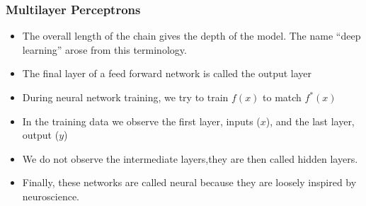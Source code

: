 \documentclass[
  shownotes,
  xcolor={svgnames},
  hyperref={colorlinks,citecolor=DarkBlue,linkcolor=DarkRed,urlcolor=DarkBlue}
  , aspectratio=169]{beamer}
\begin{document}
\begin{frame}
\frametitle{Multilayer Perceptrons}


\begin{itemize}



\item The overall length of the chain gives the depth of the model. The name “deep learning” arose from this terminology. 
\medskip 
\item The ﬁnal layer of a feed forward network is called the output layer
\medskip
\item During neural network training, we try to train $f(x)$ to match $f^*(x)$
\medskip
\item In the training data we observe the first layer, inputs ($x$), and the last layer, output ($y$)
\medskip
\item We do not observe the intermediate layers,they are then called hidden layers.
\medskip
\item Finally, these networks are called neural because they are loosely inspired by
neuroscience.



\end{itemize}
\end{frame}
\end{document}
